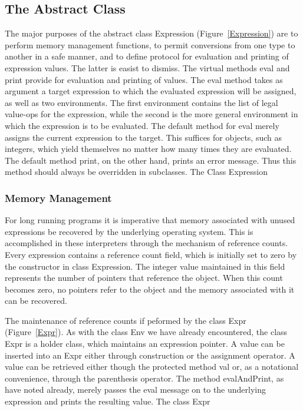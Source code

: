 \subsection{The Abstract Class}

The major purposes of the abstract class {\sf Expression}
(Figure~\ref{Expression}) are to perform memory management functions, to permit
conversions from one type to another in a safe manner, and to define protocol
for evaluation and printing of expression values.  The latter is easist to
dismiss.  The virtual methods {\sf eval} and {\sf print} provide for evaluation
and printing of values.  The {\sf eval} method takes as argument a target
expression to which the evaluated expression will be assigned, as well as two
environments.  The first environment contains the list of legal value-ops for
the expression, while the second is the more general environment in which the
expression is to be evaluated.  The default method for {\sf eval} merely assigns
the current expression to the target.  This suffices for objects, such as
integers, which yield themselves no matter how many times they are evaluated.
The default method {\sf print}, on the other hand, prints an error message.
Thus this method should always be overridden in subclasses.
%
{The Class {\sf Expression}}

\subsubsection{Memory Management}

For long running programs it is imperative that memory associated with unused
expressions be recovered by the underlying operating system.  This is
accomplished in these interpreters through the mechanism of reference counts.
Every expression contains a reference count field, which is initially set to
zero by the constructor in class {\sf Expression}.  The integer value maintained
in this field represents the number of pointers that reference the object.  When
this count becomes zero, no pointers refer to the object and the memory
associated with it can be recovered.

The maintenance of reference counts if peformed by the class {\sf Expr}
(Figure~\ref{Expr}).  As with the class {\sf Env} we have already encountered,
the class {\sf Expr} is a holder class, which maintains an expression pointer.
A value can be inserted into an {\sf Expr} either through construction or the
assignment operator.  A value can be retrieved either though the protected
method {\sf val} or, as a notational convenience, through the parenthesis
operator.  The method {\sf evalAndPrint}, as have noted already, merely passes
the {\sf eval} message on to the underlying expression and prints the resulting
value.
%
{The class {\sf Expr}}

